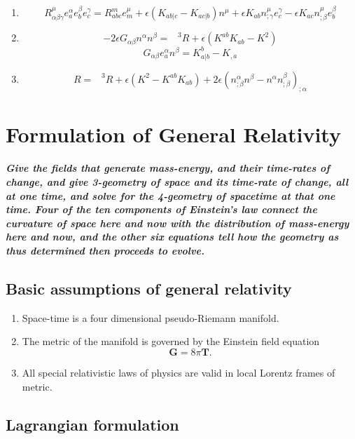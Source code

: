 \begin{newthem}
\begin{enumerate}
\item \[R^{\mu}_{\alpha \beta \gamma} e_a^{\alpha} e_b^{\beta} e_c^{\gamma} = R^m_{abc} e_m^{\mu} + \epsilon (K_{ab|c} - K_{ac|b})n^{\mu} + \epsilon K_{ab} n^{\mu}_{;\gamma}e_c^{\gamma} - \epsilon K_{ac} n^{\mu}_{;\beta}e_b^{\beta}\]
\item \[-2\epsilon G_{\alpha \beta} n^{\alpha} n^{\beta} = \phantom{R}^3R + \epsilon(K^{ab}K_{ab}-K^2)\]
\[G_{\alpha \beta} e_a^{\alpha}n^{\beta} = K^b_{a|b} - K_{,a}\]
\item \[R = \phantom{R}^3R + \epsilon(K^2-K^{ab}K_{ab}) + 2\epsilon(n^{\alpha}_{;\beta}n^{\beta}-n^{\alpha}n^{\beta}_{;\beta})_{;\alpha}\]
\end{enumerate}
\end{newthem}

\chapter{Formulation of General Relativity}
\paragraph*{Give the fields that generate mass-energy, and their time-rates of change, and give 3-geometry of space and its time-rate of change, all at one time, and solve for the 4-geometry of spacetime at that one time. Four of the ten components of Einstein's law connect the curvature of space here and now with the distribution of mass-energy here and now, and the other six equations tell how the geometry as thus determined then proceeds to evolve.}

\section{Basic assumptions of general relativity}
\begin{enumerate}
\item Space-time is a four dimensional pseudo-Riemann manifold.
\item The metric of the manifold is governed by the Einstein field equation
\[\bm{G} = 8\pi\bm{T}.\]
\item  All special relativistic laws of physics are valid in local Lorentz frames of metric.
\end{enumerate}

\section{Lagrangian formulation}
